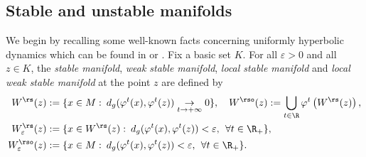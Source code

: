 \subsection{Stable and unstable manifolds} We begin by recalling some well-known facts concerning uniformly hyperbolic dynamics which can be found in \cite{katok-hasselblatt} or \cite{dyatlov}. Fix a basic set $K$. For all $\varepsilon > 0$ and all $z \in K$, the \textit{stable manifold}, \textit{weak stable manifold}, \textit{local stable manifold} and \textit{local weak stable manifold} at the point $z$ are defined by
\begin{align*}
W^\rs (z) &:= \{ x \in M: \: d_g(\varphi^t(x), \varphi^t(z)) \underset{t \to+\infty}{\to} 0 \}, \quad W^{\rso} (z):= \bigcup_{t \in \R} \varphi^t \left(W^\rs (z) \right), \\
W_{\varepsilon}^\rs (z) &:= \{ x \in W^\rs (z): \: d_g(\varphi^t(x), \varphi^t(z)) < \varepsilon, \: \: \forall t \in \R_+ \},\\
W_{\varepsilon}^{\rso} (z) &:= \{ x \in M: \: d_g(\varphi^t(x), \varphi^t(z)) < \varepsilon, \: \: \forall t \in \R_+ \}.
\end{align*}

